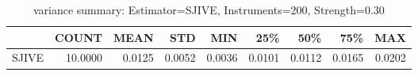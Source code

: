 \begin{table}[ht]
\centering
\caption{variance summary: Estimator=SJIVE, Instruments=200, Strength=0.30}
\begin{tabular}{lrrrrrrrr}
\toprule
 & COUNT & MEAN & STD & MIN & 25\% & 50\% & 75\% & MAX \\
\midrule
SJIVE & 10.0000 & 0.0125 & 0.0052 & 0.0036 & 0.0101 & 0.0112 & 0.0165 & 0.0202 \\
\bottomrule
\end{tabular}
\end{table}
